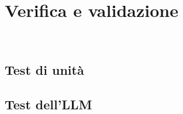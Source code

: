 \chapter{Verifica e validazione}
\label{cap:verifica-validazione}

\\

\section{Test di unità}

\section{Test dell’LLM}
